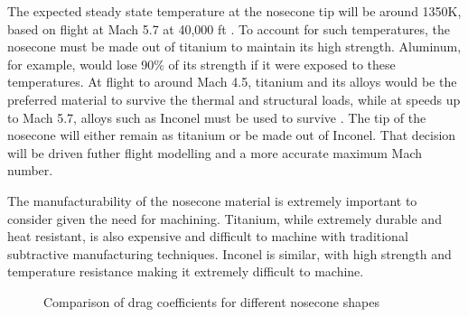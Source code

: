 The expected steady state temperature at the nosecone tip will be around 1350K, based on flight at Mach 5.7 at 40,000 ft \cite{fleeman}. To account for such temperatures, the nosecone must be made out of titanium to maintain its high strength. Aluminum, for example, would lose 90\% of its strength if it were exposed to these temperatures. At flight to around Mach 4.5, titanium and its alloys would be the preferred material to survive the thermal and structural loads, while at speeds up to Mach 5.7, alloys such as Inconel must be used to survive \cite{fleeman}. The tip of the nosecone will either remain as titanium or be made out of Inconel. That decision will be driven futher flight modelling and a more accurate maximum Mach number.

The manufacturability of the nosecone material is extremely important to consider given the need for machining. Titanium, while extremely durable and heat resistant, is also expensive and difficult to machine with traditional subtractive manufacturing techniques. Inconel is similar, with high strength and temperature resistance making it extremely difficult to machine.

\begin{figure}
    \centering
    \caption{Comparison of drag coefficients for different nosecone shapes}
    \label{figure:noseone-cd}
\end{figure}

